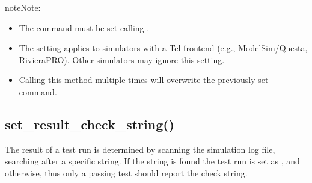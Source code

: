 \documentclass[letterpaper,10pt,english]{sphinxmanual}
\begin{document}
\begin{sphinxadmonition}{note}{Note:}\begin{itemize}
\item {} 
\sphinxAtStartPar
The command must be set  calling .

\item {} 
\sphinxAtStartPar
The setting applies to simulators with a Tcl front\sphinxhyphen{}end (e.g., ModelSim/Questa, Riviera\sphinxhyphen{}PRO). Other simulators
may ignore this setting.

\item {} 
\sphinxAtStartPar
Calling this method multiple times will overwrite the previously set command.

\end{itemize}
\end{sphinxadmonition}

\sphinxAtStartPar
{}

\begin{sphinxVerbatim}[commandchars=\\\{\}]
\end{sphinxVerbatim}


\subsection{set\_result\_check\_string()}
\label{\detokenize{api:set-result-check-string}}
\sphinxAtStartPar
The result of a test run is determined by scanning the simulation log file, searching after a specific string.
If the string is found the test run is set as , and  otherwise, thus only a passing test should
report the check string.

\begin{sphinxVerbatim}[commandchars=\\\{\}]
\end{sphinxVerbatim}
\end{document}
